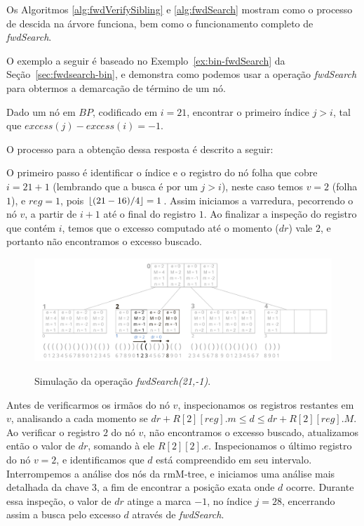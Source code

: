 Os Algoritmos \ref{alg:fwdVerifySibling} e \ref{alg:fwdSearch} mostram como o processo de descida na árvore funciona, bem como o funcionamento completo de \textit{fwdSearch}.



O exemplo a seguir é baseado no Exemplo~\ref{ex:bin-fwdSearch} da Seção~\ref{sec:fwdsearch-bin}, e demonstra como podemos usar a operação \textit{fwdSearch} para obtermos a demarcação de término de um nó.
\begin{example}
Dado um nó em $BP$, codificado em $i=21$, encontrar o primeiro índice $j>i$, tal que $excess(j) - excess(i) = -1$.

O processo para a obtenção dessa resposta é descrito a seguir:

 O primeiro passo é identificar  o índice e o registro do nó folha que cobre $i=21+1$ (lembrando que a busca é por um $j > i$), neste caso temos $v = 2$ (folha $1$), e $reg = 1$, pois $\lfloor(21 - 16)/4\rfloor = 1$. Assim iniciamos a varredura, pecorrendo o nó $v$, a partir de $i+1$ até o final do registro $1$. Ao finalizar a inspeção do registro que contém $i$, 
 temos que o excesso computado até o momento ($dr$) vale $2$, e portanto não encontramos o excesso buscado.
 
 \begin{figure}[h!]
    \centering
      \caption[fwdSearch(21,-1).]{Simulação da operação \textit{fwdSearch(21,-1)}.}
      \includegraphics[width=\columnwidth]{images/rmm-tree-kary-fwdsearch.png}
      \label{fig:kary-fwdSearch}
 \end{figure}
\end{example}
Antes de verificarmos os irmãos do nó $v$, inspecionamos os registros restantes em $v$, analisando a cada momento se $dr + R[2][reg].m \leq d \leq dr + R[2][reg].M$. Ao verificar o registro $2$ do nó $v$, não encontramos o excesso buscado, atualizamos então o valor de $dr$, somando à ele $R[2][2].e$. Inspecionamos o último registro do nó $v=2$, e identificamos que $d$ está compreendido em seu intervalo. Interrompemos a análise dos nós da rmM-tree, e iniciamos uma análise mais detalhada da chave $3$, a fim de encontrar a posição exata onde $d$ ocorre. Durante essa inspeção, o valor de $dr$ atinge a marca $-1$, no índice $j=28$, encerrando assim a busca pelo excesso $d$ através de \textit{fwdSearch}.

